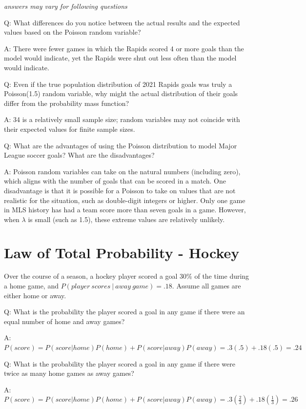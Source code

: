 \documentclass[
  11pt,
]{book}
\theoremstyle{definition}
\theoremstyle{definition}
\theoremstyle{definition}
\theoremstyle{definition}
\theoremstyle{remark}
\begin{document}
\emph{answers may vary for following questions}

Q: What differences do you notice between the actual results and the expected values based on the Poisson random variable?

A: There were fewer games in which the Rapids scored 4 or more goals than the model would indicate, yet the Rapids were shut out less often than the model would indicate.

Q: Even if the true population distribution of 2021 Rapids goals was truly a Poisson(1.5) random variable, why might the actual distribution of their goals differ from the probability mass function?

A: 34 is a relatively small sample size; random variables may not coincide with their expected values for finite sample sizes.

Q: What are the advantages of using the Poisson distribution to model Major League soccer goals? What are the disadvantages?

A: Poisson random variables can take on the natural numbers (including zero), which aligns with the number of goals that can be scored in a match. One disadvantage is that it is possible for a Poisson to take on values that are not realistic for the situation, such as double-digit integers or higher. Only one game in MLS history has had a team score more than seven goals in a game. However, when \(\lambda\) is small (such as 1.5), these extreme values are relatively unlikely.

\hypertarget{law-of-total-probability---hockey}{%
\section{Law of Total Probability - Hockey}\label{law-of-total-probability---hockey}}

Over the course of a season, a hockey player scored a goal 30\% of the time during a home game, and \(P(player\ scores\ |\ away\ game) = .18\). Assume all games are either home or away.

Q: What is the probability the player scored a goal in any game if there were an equal number of home and away games?

A: \(P(score) = P(score|home)P(home) + P(score|away)P(away) = .3(.5) + .18(.5) = .24\)

Q: What is the probability the player scored a goal in any game if there were twice as many home games as away games?

A: \(P(score) = P(score|home)P(home) + P(score|away)P(away) = .3(\frac{2}{3}) + .18(\frac{1}{3}) = .26\)
\end{document}
